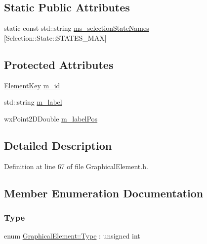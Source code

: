 \subsection*{Static Public Attributes}
\begin{DoxyCompactItemize}
\item 
static const std\+::string \hyperlink{class_graphical_element_afac661e0e1c8a699c8f8264dc99437cc}{ms\+\_\+selection\+State\+Names} \mbox{[}Selection\+::\+State\+::\+S\+T\+A\+T\+E\+S\+\_\+\+M\+AX\mbox{]}
\end{DoxyCompactItemize}
\subsection*{Protected Attributes}
\begin{DoxyCompactItemize}
\item 
\hyperlink{_graphical_element_8h_ade5fd6c85839a416577ff9de1605141e}{Element\+Key} \hyperlink{class_graphical_element_a03d7e29a10d456a4944ce06c6964d15a}{m\+\_\+id}
\item 
std\+::string \hyperlink{class_graphical_element_ae7f90a74fb05130a8bb97617b433c918}{m\+\_\+label}
\item 
wx\+Point2\+D\+Double \hyperlink{class_graphical_element_acc200c4f7baf224cc972021d0c66cf35}{m\+\_\+label\+Pos}
\end{DoxyCompactItemize}


\subsection{Detailed Description}


Definition at line 67 of file Graphical\+Element.\+h.



\subsection{Member Enumeration Documentation}
\mbox{\label{class_graphical_element_aa485be48b901d85de97b3bd86f381d9e}} 
\subsubsection{\texorpdfstring{Type}{Type}}
{\footnotesize\ttfamily enum \hyperlink{class_graphical_element_aa485be48b901d85de97b3bd86f381d9e}{Graphical\+Element\+::\+Type} \+: unsigned int}

